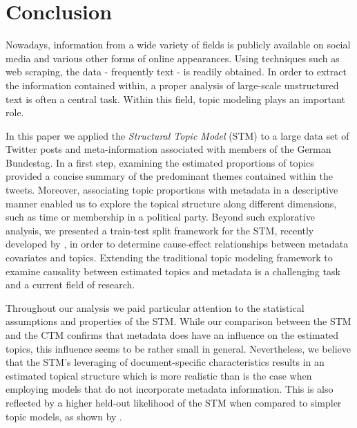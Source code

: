 \section{Conclusion}
\label{Conclusion}

Nowadays, information from a wide variety of fields is publicly available on social media and various other forms of online appearances. Using techniques such as web scraping, the data - frequently text - is readily obtained. In order to extract the information contained within, a proper analysis of large-scale unstructured text is often a central task. Within this field, topic modeling plays an important role.

In this paper we applied the \textit{Structural Topic Model} (STM) to a large data set of Twitter posts and meta-information associated with members of the German Bundestag. In a first step, examining the estimated proportions of topics provided a concise summary of the predominant themes contained within the tweets. Moreover, associating topic proportions with metadata in a descriptive manner enabled us to explore the topical structure along different dimensions, such as time or membership in a political party. Beyond such explorative analysis, we presented a train-test split framework for the STM, recently developed by \cite{egami2018make}, in order to determine cause-effect relationships between metadata covariates and topics. Extending the traditional topic modeling framework to examine causality between estimated topics and metadata is a challenging task and a current field of research. 

Throughout our analysis we paid particular attention to the statistical assumptions and properties of the STM. While our comparison between the STM and the CTM confirms that metadata does have an influence on the estimated topics, this influence seems to be rather small in general. Nevertheless, we believe that the STM's leveraging of document-specific characteristics results in an estimated topical structure which is more realistic than is the case when employing models that do not incorporate metadata information. This is also reflected by a higher held-out likelihood of the STM when compared to simpler topic models, as shown by \cite{roberts2016model}. 

